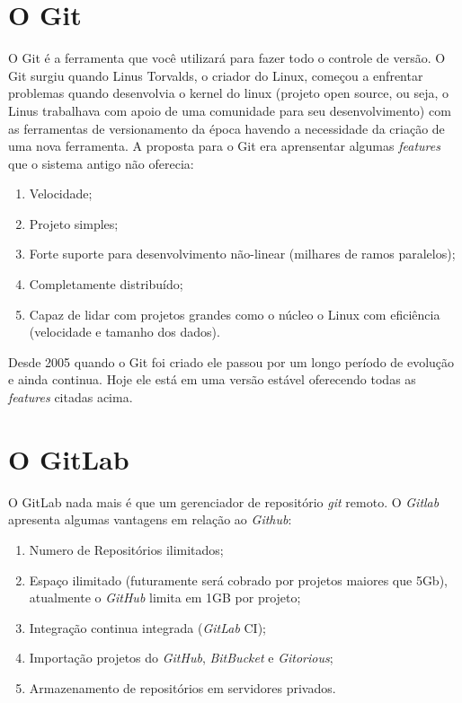 \documentclass[12pt,openright,oneside,a4paper,english,brazil]{abntex2}
\begin{document}
\section{O Git}

O Git é a ferramenta que você utilizará para fazer todo o controle de versão. O Git surgiu quando Linus Torvalds, o criador do Linux, começou a enfrentar problemas quando desenvolvia o kernel do linux (projeto open source, ou seja, o Linus trabalhava com apoio de uma comunidade para seu desenvolvimento) com as ferramentas de versionamento da época havendo a necessidade da criação de uma nova ferramenta. A proposta para o Git era aprensentar algumas \textit{features} que o sistema antigo não oferecia:

\begin{enumerate}
	\item Velocidade;
	\item Projeto simples;
	\item Forte suporte para desenvolvimento não-linear (milhares de ramos paralelos);
	\item Completamente distribuído;
	\item Capaz de lidar com projetos grandes como o núcleo o Linux com eficiência (velocidade e tamanho dos dados).	
\end{enumerate}

Desde 2005 quando o Git foi criado ele passou por um longo período de evolução e ainda continua. Hoje ele está em uma versão estável oferecendo todas as \textit{features} citadas acima.

\section{O GitLab \label{gitlab}}

O GitLab nada mais é que um gerenciador de repositório \textit{git} remoto. O \textit{Gitlab} apresenta algumas vantagens em relação ao \textit{Github}:

\begin{enumerate}
	\item Numero de Repositórios ilimitados;
	\item Espaço ilimitado (futuramente será cobrado por projetos maiores que 5Gb), atualmente o \textit{GitHub} limita em 1GB por projeto;
	\item Integração continua integrada (\textit{GitLab} CI);
	\item Importação projetos do \textit{GitHub}, \textit{BitBucket} e \textit{Gitorious};
	\item Armazenamento de repositórios em servidores privados.
\end{enumerate}
\end{document}
